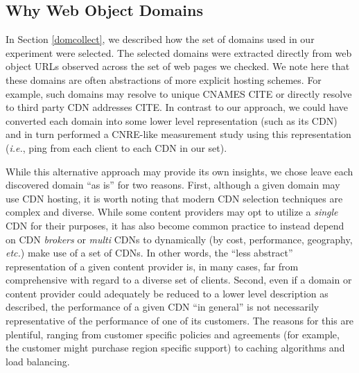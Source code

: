 \subsection{Why Web Object Domains}

In Section \ref{domcollect}, we described how the set of domains used in our
experiment were selected. The selected domains were extracted directly
from web object URLs observed across the set of web pages we checked. We note
here that these domains are often abstractions of more explicit hosting schemes.
For example, such domains may resolve to unique CNAMES CITE or directly resolve
to third party CDN addresses CITE. In contrast to our approach, we could have
converted each domain into some lower level representation (such as its CDN) and
in turn performed a CNRE-like measurement study using this representation
(\emph{i.e.}, ping from each client to each CDN in our set).

While this alternative approach may provide its own insights, we chose leave
each discovered domain ``as is'' for two reasons. First, although a given domain
may use CDN hosting, it is worth noting that modern CDN selection techniques are
complex and diverse. While some content providers may opt to utilize a
\emph{single} CDN for their purposes, it has also become common practice to
instead depend on CDN \emph{brokers} or \emph{multi} CDNs to dynamically (by
cost, performance, geography, \emph{etc.}) make use of a set of CDNs. In other
words, the ``less abstract'' representation of a given content provider is, in
many cases, far from comprehensive with regard to a diverse set of clients.
Second, even if a domain or content provider could adequately be reduced to a
lower level description as described, the performance of a given CDN ``in
general'' is not necessarily representative of the performance of one of its
customers. The reasons for this are plentiful, ranging from customer specific
policies and agreements (for example, the customer might purchase region
specific support) to caching algorithms and load balancing. 
